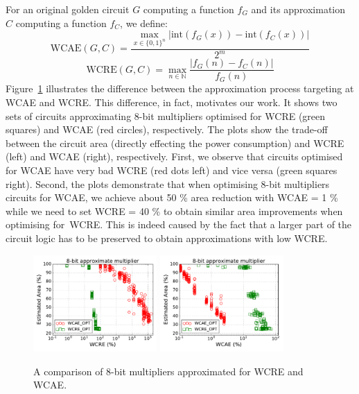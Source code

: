 \documentclass[runningheads]{llncs}
\begin{document}
For an original golden circuit $G$ computing a function $f_{G}$ and its
approximation $C$  computing a function $f_{C}$, we define: \begin{equation}
\label{eq:wcae} \mbox{WCAE}(G,C) = \frac{\max_{x\in
\{0,1\}^n}\left|\mathrm{int}(f_G(x)) - \mathrm{int}(f_C(x))\right|}{2^m}
\end{equation} \begin{equation} \label{eq:wcre} \mbox{WCRE}(G,C) = \max_{n \in
\mathbb{N}} \frac{\left|f_{G}(n) - f_{C}(n)\right|}{f_{G}(n)} \end{equation}
%
Figure~\ref{fig:comp} illustrates the difference between the approximation
process targeting at WCAE and WCRE. This difference, in fact, motivates our
work. It shows two sets of circuits approximating 8-bit multipliers optimised
for WCRE (green squares)  and WCAE (red circles), respectively.  The plots show
the trade-off between the circuit area (directly effecting the power
consumption) and WCRE (left) and WCAE (right), respectively. First, we observe
that circuits optimised for WCAE have very bad WCRE (red dots left) and vice
versa (green squares right). Second, the plots demonstrate that when optimising
8-bit multipliers circuits for WCAE, we achieve about 50 \% area reduction with
WCAE = 1 \% while we need to set WCRE = 40 \% to obtain similar area
improvements when optimising for~WCRE. This is indeed caused by the fact that a
larger part of the circuit logic has to be preserved to obtain approximations
with low  WCRE.

\begin{figure}[t]
\centering
\includegraphics[width=0.42\textwidth]{img/multApprox8_WCRE.pdf}
\includegraphics[width=0.42\textwidth]{img/multApprox8_WCAE.pdf}
\vspace{-1.5em}
\caption{A comparison of 8-bit multipliers approximated for WCRE and WCAE.} 
\label{mult_pareto_wre}
\label{fig:comp}
\end{figure}
\end{document}
